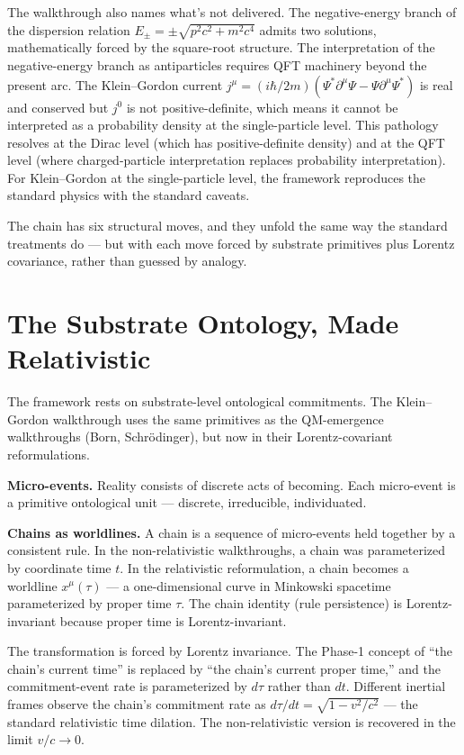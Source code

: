 \documentclass[11pt,a4paper]{article}
\begin{document}
The walkthrough also names what's not delivered. The negative-energy branch of the dispersion relation $E_\pm = \pm\sqrt{p^2c^2 + m^2c^4}$ admits two solutions, mathematically forced by the square-root structure. The interpretation of the negative-energy branch as antiparticles requires QFT machinery beyond the present arc. The Klein--Gordon current $j^\mu = (i\hbar/2m)(\Psi^*\partial^\mu\Psi - \Psi\partial^\mu\Psi^*)$ is real and conserved but $j^0$ is not positive-definite, which means it cannot be interpreted as a probability density at the single-particle level. This pathology resolves at the Dirac level (which has positive-definite density) and at the QFT level (where charged-particle interpretation replaces probability interpretation). For Klein--Gordon at the single-particle level, the framework reproduces the standard physics with the standard caveats.

The chain has six structural moves, and they unfold the same way the standard treatments do --- but with each move forced by substrate primitives plus Lorentz covariance, rather than guessed by analogy.

\section{The Substrate Ontology, Made Relativistic}

The framework rests on substrate-level ontological commitments. The Klein--Gordon walkthrough uses the same primitives as the QM-emergence walkthroughs (Born, Schr\"odinger), but now in their Lorentz-covariant reformulations.

\textbf{Micro-events.} Reality consists of discrete acts of becoming. Each micro-event is a primitive ontological unit --- discrete, irreducible, individuated.

\textbf{Chains as worldlines.} A chain is a sequence of micro-events held together by a consistent rule. In the non-relativistic walkthroughs, a chain was parameterized by coordinate time $t$. In the relativistic reformulation, a chain becomes a worldline $x^\mu(\tau)$ --- a one-dimensional curve in Minkowski spacetime parameterized by proper time $\tau$. The chain identity (rule persistence) is Lorentz-invariant because proper time is Lorentz-invariant.

The transformation is forced by Lorentz invariance. The Phase-1 concept of ``the chain's current time'' is replaced by ``the chain's current proper time,'' and the commitment-event rate is parameterized by $d\tau$ rather than $dt$. Different inertial frames observe the chain's commitment rate as $d\tau/dt = \sqrt{1 - v^2/c^2}$ --- the standard relativistic time dilation. The non-relativistic version is recovered in the limit $v/c \to 0$.
\end{document}
